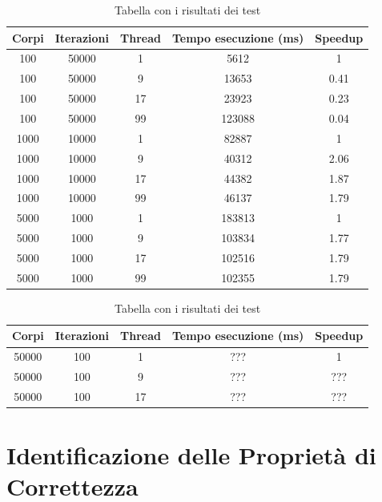 \documentclass[12pt,a4paper,openright,twoside]{book}
\begin{document}
\begin{center}
	\begin{table}
		\begin{tabular}{ |c|c|c|c|c| } 
			\hline
				Corpi & Iterazioni & Thread & Tempo esecuzione (ms) & Speedup \\
			\hline
				100  & 50000  & 1 & 5612 & 1 \\
			\hline
				100  & 50000  & 9 & 13653 & 0.41 \\
			\hline
				100  & 50000  & 17 & 23923 & 0.23 \\
			\hline
				100  & 50000  & 99 & 123088 & 0.04 \\
			\hline
				1000  & 10000  & 1 & 82887 & 1 \\
			\hline
				1000  & 10000  & 9 & 40312 & 2.06 \\
			\hline
				1000  & 10000  & 17 & 44382 & 1.87 \\
			\hline
				1000  & 10000  & 99 & 46137 & 1.79 \\
			\hline
				5000  & 1000  & 1 & 183813 & 1 \\
			\hline
				5000  & 1000  & 9 & 103834 & 1.77 \\
			\hline
				5000  & 1000  & 17 & 102516 & 1.79 \\
			\hline
				5000  & 1000  & 99 & 102355 & 1.79 \\
			\hline
		\end{tabular}
		\label{tab:table1}
		\caption{Tabella con i risultati dei test}
	\end{table}
\end{center}

\begin{center}
	\begin{table}
		\begin{tabular}{ |c|c|c|c|c| } 
			\hline
				Corpi & Iterazioni & Thread & Tempo esecuzione (ms) & Speedup \\
			\hline
				50000  & 100  & 1 & ??? & 1 \\
			\hline
				50000  & 100  & 9 & ??? & ??? \\
			\hline
				50000  & 100  & 17 & ??? & ??? \\
			\hline
		\end{tabular}
		\label{tab:table2}
		\caption{Tabella con i risultati dei test}
	\end{table}
\end{center}

\chapter{Identificazione delle Proprietà di Correttezza} %
\label{chap:Identificazione delle Proprietà di Correttezza}
\end{document}
